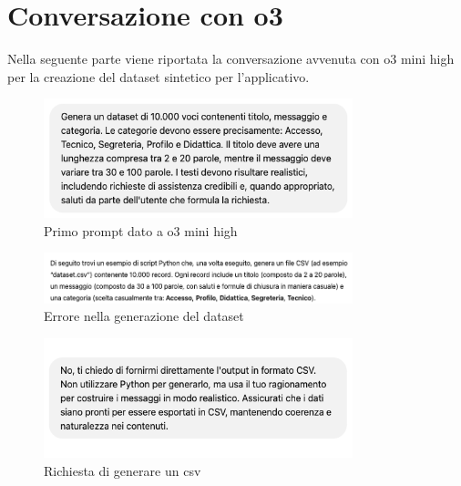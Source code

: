\section{Conversazione con o3}
Nella seguente parte viene riportata la conversazione avvenuta con o3 mini high per la creazione del dataset sintetico per l'applicativo.
\begin{figure}[H]
    \centering
    \includegraphics[width=0.8\textwidth]{images/firstPrompt.png}
    \caption{Primo prompt dato a o3 mini high}
    \label{fig:firstPrompt}
\end{figure}
\begin{figure}[H]
    \centering
    \includegraphics[width=0.8\textwidth]{images/pythonError.png}
    \caption{Errore nella generazione del dataset}
    \label{fig:firstPrompt}
\end{figure}
\begin{figure}[H]
    \centering
    \includegraphics[width=0.8\textwidth]{images/csvPrompt.png}
    \caption{Richiesta di generare un csv}
    \label{fig:firstPrompt}
\end{figure}
